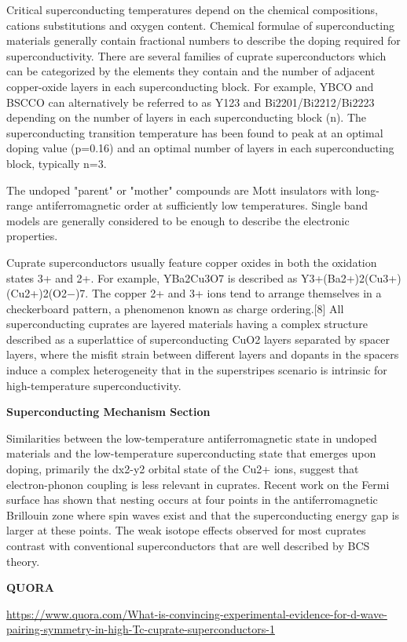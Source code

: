\documentclass[a4paper,10pt]{article}
\begin{document}
Critical superconducting temperatures depend on the chemical compositions, cations substitutions and oxygen content. Chemical formulae of superconducting materials generally contain fractional numbers to describe the doping required for superconductivity. There are several families of cuprate superconductors which can be categorized by the elements they contain and the number of adjacent copper-oxide layers in each superconducting block. For example, YBCO and BSCCO can alternatively be referred to as Y123 and Bi2201/Bi2212/Bi2223 depending on the number of layers in each superconducting block (n). The superconducting transition temperature has been found to peak at an optimal doping value (p=0.16) and an optimal number of layers in each superconducting block, typically n=3.

The undoped "parent" or "mother" compounds are Mott insulators with long-range antiferromagnetic order at sufficiently low temperatures. Single band models are generally considered to be enough to describe the electronic properties.

Cuprate superconductors usually feature copper oxides in both the oxidation states 3+ and 2+. For example, YBa2Cu3O7 is described as Y3+(Ba2+)2(Cu3+)(Cu2+)2(O2−)7. The copper 2+ and 3+ ions tend to arrange themselves in a checkerboard pattern, a phenomenon known as charge ordering.[8] All superconducting cuprates are layered materials having a complex structure described as a superlattice of superconducting CuO2 layers separated by spacer layers, where the misfit strain between different layers and dopants in the spacers induce a complex heterogeneity that in the superstripes scenario is intrinsic for high-temperature superconductivity.

\textbf{Superconducting Mechanism Section}

Similarities between the low-temperature antiferromagnetic state in undoped materials and the low-temperature superconducting state that emerges upon doping, primarily the dx2-y2 orbital state of the Cu2+ ions, suggest that electron-phonon coupling is less relevant in cuprates. Recent work on the Fermi surface has shown that nesting occurs at four points in the antiferromagnetic Brillouin zone where spin waves exist and that the superconducting energy gap is larger at these points. The weak isotope effects observed for most cuprates contrast with conventional superconductors that are well described by BCS theory.

\textbf{QUORA}

\url{https://www.quora.com/What-is-convincing-experimental-evidence-for-d-wave-pairing-symmetry-in-high-Tc-cuprate-superconductors-1}
\end{document}
